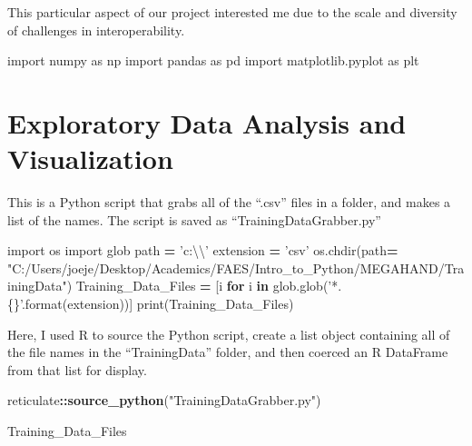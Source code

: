 \documentclass[]{article}
\newenvironment{Shaded}{\begin{snugshade}}{\end{snugshade}}
\newcommand{\KeywordTok}[1]{\textcolor[rgb]{0.13,0.29,0.53}{\textbf{#1}}}
\newcommand{\CharTok}[1]{\textcolor[rgb]{0.31,0.60,0.02}{#1}}
\newcommand{\SpecialCharTok}[1]{\textcolor[rgb]{0.00,0.00,0.00}{#1}}
\newcommand{\StringTok}[1]{\textcolor[rgb]{0.31,0.60,0.02}{#1}}
\newcommand{\ImportTok}[1]{#1}
\newcommand{\ControlFlowTok}[1]{\textcolor[rgb]{0.13,0.29,0.53}{\textbf{#1}}}
\newcommand{\OperatorTok}[1]{\textcolor[rgb]{0.81,0.36,0.00}{\textbf{#1}}}
\newcommand{\BuiltInTok}[1]{#1}
\newcommand{\NormalTok}[1]{#1}
\begin{document}
This particular aspect of our project interested me due to the scale and
diversity of challenges in interoperability.

\begin{Shaded}
\begin{Highlighting}[]
\ImportTok{import}\NormalTok{ numpy }\ImportTok{as}\NormalTok{ np}
\ImportTok{import}\NormalTok{ pandas }\ImportTok{as}\NormalTok{ pd}
\ImportTok{import}\NormalTok{ matplotlib.pyplot }\ImportTok{as}\NormalTok{ plt}
\end{Highlighting}
\end{Shaded}

\section{Exploratory Data Analysis and
Visualization}\label{exploratory-data-analysis-and-visualization}

This is a Python script that grabs all of the ``.csv'' files in a
folder, and makes a list of the names. The script is saved as
``TrainingDataGrabber.py''

\begin{Shaded}
\begin{Highlighting}[]
\ImportTok{import}\NormalTok{ os}
\ImportTok{import}\NormalTok{ glob}
\NormalTok{path }\OperatorTok{=} \StringTok{'c:}\CharTok{\textbackslash{}\textbackslash{}}\StringTok{'}
\NormalTok{extension }\OperatorTok{=} \StringTok{'csv'}
\NormalTok{os.chdir(path}\OperatorTok{=} \StringTok{"C:/Users/joeje/Desktop/Academics/FAES/Intro_to_Python/MEGAHAND/TrainingData"}\NormalTok{)}
\NormalTok{Training_Data_Files }\OperatorTok{=}\NormalTok{ [i }\ControlFlowTok{for}\NormalTok{ i }\KeywordTok{in}\NormalTok{ glob.glob(}\StringTok{'*.}\SpecialCharTok{\{\}}\StringTok{'}\NormalTok{.}\BuiltInTok{format}\NormalTok{(extension))]}
\BuiltInTok{print}\NormalTok{(Training_Data_Files)}
\end{Highlighting}
\end{Shaded}

Here, I used R to source the Python script, create a list object
containing all of the file names in the ``TrainingData'' folder, and
then coerced an R DataFrame from that list for display.

\begin{Shaded}
\begin{Highlighting}[]
\NormalTok{reticulate}\OperatorTok{::}\KeywordTok{source_python}\NormalTok{(}\StringTok{"TrainingDataGrabber.py"}\NormalTok{)}

\NormalTok{Training_Data_Files}
\end{Highlighting}
\end{Shaded}
\end{document}
